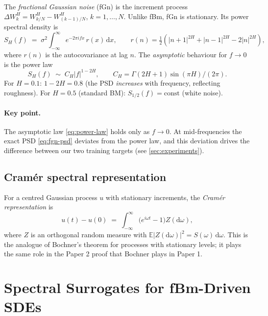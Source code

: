\documentclass[11pt,a4paper]{article}
\newcommand{\E}{\mathbb{E}}
\begin{document}
The \emph{fractional Gaussian noise} (fGn) is the increment process
$\Delta W^H_k = W^H_{k/N} - W^H_{(k-1)/N}$, $k = 1, \ldots, N$.
Unlike fBm, fGn is stationary. Its power spectral density is
\begin{equation}
 S_H(f) \;=\; \sigma^2 \int_{-\infty}^{\infty}
  e^{-2\pi i f x}\, r(x) \,\mathrm{d}x,
 \qquad
 r(n) = \tfrac{1}{2}(|n+1|^{2H} + |n-1|^{2H} - 2|n|^{2H}),
 \label{eq:fgn-psd}
\end{equation}
where $r(n)$ is the autocovariance at lag $n$. The \emph{asymptotic}
behaviour for $f \to 0$ is the power law
\begin{equation}
 S_H(f) \;\sim\; C_H |f|^{1-2H}, \qquad
 C_H = \Gamma(2H+1)\sin(\pi H)/(2\pi).
 \label{eq:power-law}
\end{equation}
For $H = 0.1$: $1 - 2H = 0.8$ (the PSD \emph{increases} with frequency,
reflecting roughness). For $H = 0.5$ (standard BM): $S_{1/2}(f) =
\text{const}$ (white noise).

\paragraph{Key point.} The asymptotic law \eqref{eq:power-law} holds
only as $f \to 0$. At mid-frequencies the exact PSD \eqref{eq:fgn-psd}
deviates from the power law, and this deviation drives the difference
between our two training targets (see \cref{sec:experiments}).

\subsection{Cramér spectral representation}

For a centred Gaussian process $u$ with stationary increments, the
\emph{Cramér representation} \citep{cramer1942harmonic} is
\begin{equation}
 u(t) - u(0) \;=\; \int_{-\infty}^{\infty}
  \bigl(e^{i\omega t} - 1\bigr) Z(\mathrm{d}\omega),
 \label{eq:cramer}
\end{equation}
where $Z$ is an orthogonal random measure with
$\E|Z(\mathrm{d}\omega)|^2 = S(\omega)\,\mathrm{d}\omega$.
This is the analogue of Bochner's theorem for processes with stationary
levels; it plays the same role in the Paper 2 proof that Bochner plays
in Paper 1.

\section{Spectral Surrogates for fBm-Driven SDEs}
\label{sec:method}
\end{document}
